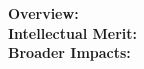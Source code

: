 \documentclass[../preamble.tex]{subfiles}
\begin{document}
%
%
%


%
%
%
%





\noindent\textbf{Overview:}\\

\noindent\textbf{Intellectual Merit:}\\

\noindent\textbf{Broader Impacts:}\\






\end{document}
